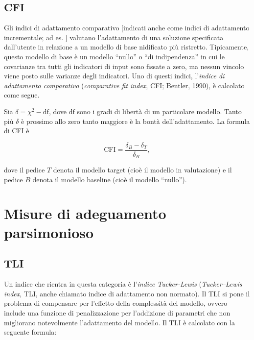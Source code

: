\documentclass[
  11pt,
]{krantz}
\theoremstyle{definition}
\theoremstyle{definition}
\theoremstyle{definition}
\theoremstyle{definition}
\theoremstyle{remark}
\begin{document}
\hypertarget{cfi}{%
\subsection{CFI}\label{cfi}}

Gli indici di adattamento comparativo {[}indicati anche come indici di adattamento incrementale; ad es. \citet{hu1998fit}{]} valutano l'adattamento di una soluzione specificata dall'utente in relazione a un modello di base nidificato più ristretto. Tipicamente, questo modello di base è un modello ``nullo'' o ``di indipendenza'' in cui le covarianze tra tutti gli indicatori di input sono fissate a zero, ma nessun vincolo viene posto sulle varianze degli indicatori. Uno di questi indici, l'\emph{indice di adattamento comparativo} (\emph{comparative fit index}, CFI; Bentler, 1990), è calcolato come segue.

Sia \(\delta = \chi^2 - \mbox{df}\), dove \(\mbox{df}\) sono i gradi di libertà di un particolare modello. Tanto più \(\delta\) è prossimo allo zero tanto maggiore è la bontà dell'adattamento. La formula di CFI è

\begin{equation}
\mbox{CFI} = \frac{\delta_B - \delta_T}{\delta_B},
\end{equation}

dove il pedice \(T\) denota il modello target (cioè il modello in valutazione) e il pedice \(B\) denota il modello baseline (cioè il modello ``nullo'').

\hypertarget{misure-di-adeguamento-parsimonioso}{%
\section{Misure di adeguamento parsimonioso}\label{misure-di-adeguamento-parsimonioso}}

\hypertarget{tli}{%
\subsection{TLI}\label{tli}}

Un indice che rientra in questa categoria è l'\emph{indice Tucker-Lewis} (\emph{Tucker--Lewis index}, TLI, anche chiamato indice di adattamento non normato). Il TLI si pone il problema di compensare per l'effetto della complessità del modello, ovvero include una funzione di penalizzazione per l'addizione di parametri che non migliorano notevolmente l'adattamento del modello. Il TLI è calcolato con la seguente formula:
\end{document}
